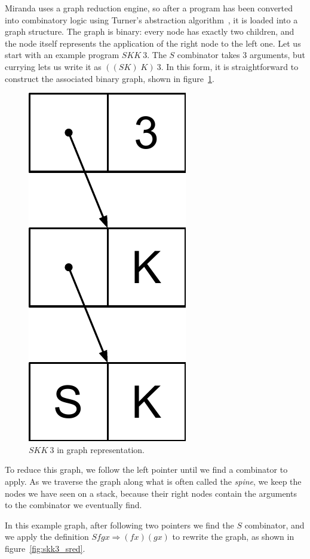 \documentclass[conference]{IEEEtran}
\begin{document}
Miranda uses a graph reduction engine, so after a program has been converted into combinatory logic using Turner's abstraction algorithm~\cite{turner_another_1979}, it is loaded into a graph structure.
The graph is binary: every node has exactly two children, and the node itself represents the application of the right node to the left one.
Let us start with an example program $SKK \ 3$.
The $S$ combinator takes 3 arguments, but currying lets us write it as $((SK) \; K)\ 3$.
In this form, it is straightforward to construct the associated binary graph, shown in figure~\ref{fig:skk3}.

\begin{figure}
    \includegraphics[width=.23\columnwidth]{skk3}
    \centering
    \caption{$SKK \ 3$ in graph representation.}
    \label{fig:skk3}
\end{figure}

To reduce this graph, we follow the left pointer until we find a combinator to apply.
As we traverse the graph along what is often called the \textit{spine}, we keep the nodes we have seen on a stack, because their right nodes contain the arguments to the combinator we eventually find.

In this example graph, after following two pointers we find the $S$ combinator, and we apply the definition $S f g x \Rightarrow (f x) (g x)$ to rewrite the graph, as shown in figure~\ref{fig:skk3_sred}.
\end{document}

